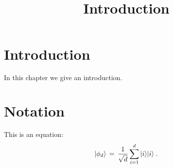 

%


\title{Introduction}


\maketitle

\label{section-phantom}

\tableofcontents

\section{Introduction}
\label{section:introduction}

In this chapter we give an introduction.

\section{Notation}
\label{section-notation}

This is an equation:
\begin{equation}
\label{eq:me-state}
 |\phi_d\rangle \,=\,\frac{1}{\sqrt{d}} \sum_{i=1}^d |i\rangle|i\rangle\;.
\end{equation}








